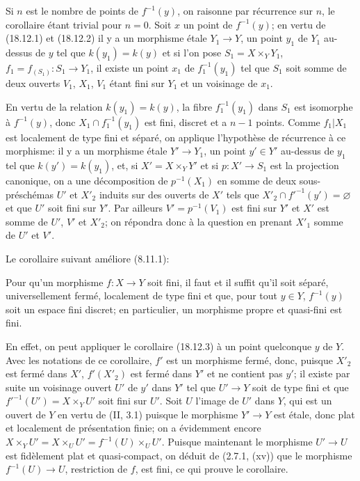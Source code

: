 Si $n$ est le nombre de points de $f^{-1}(y)$, on raisonne par récurrence sur $n$, le corollaire étant trivial pour $n=0$. Soit $x$ un point de $f^{-1}(y)$; en vertu de (18.12.1) et (18.12.2) il y a un morphisme étale $Y_1\to Y$, un point $y_1$ de $Y_1$ au-dessus de $y$ tel que $k(y_1)=k(y)$ et si l'on pose $S_1=X\times_Y Y_1$, $f_1=f_{(S_1)}:S_1\to Y_1$, il existe un point $x_1$ de $f_1^{-1}(y_1)$ tel que $S_1$ soit somme de deux ouverts $V_1$, $X_1$, $V_1$ étant fini sur $Y_1$ et un voisinage de $x_1$.


En vertu de la relation $k(y_1)=k(y)$, la fibre $f_1^{-1}(y_1)$ dans $S_1$ est isomorphe à $f^{-1}(y)$, donc $X_1\cap f_1^{-1}(y_1)$ est fini, discret et a $n-1$ points. Comme $f_1|X_1$ est localement de type fini et séparé, on applique l'hypothèse de récurrence à ce morphisme: il y a un morphisme étale $Y'\to Y_1$, un point $y'\in Y'$ au-dessus de $y_1$ tel que $k(y')=k(y_1)$, et, si $X'=X\times_Y Y'$ et si $p:X'\to S_1$ est la projection canonique, on a une décomposition de $p^{-1}(X_1)$ en somme de deux sous-préschémas $U'$ et $X'_2$ induits sur des ouverts de $X'$ tels que $X'_2\cap f'^{-1}(y')=\varnothing$ et que $U'$ soit fini sur $Y'$. Par ailleurs $V'=p^{-1}(V_1)$ est fini sur $Y'$ et $X'$ est somme de $U'$, $V'$ et $X'_2$; on répondra donc à la question en prenant $X'_1$ somme de $U'$ et $V'$.

Le corollaire suivant améliore (8.11.1):

\begin{corollary}[18.12.4]
\label{IV.18.12.4}
Pour qu'un morphisme $f:X\to Y$ soit fini, il faut et il suffit qu'il soit séparé, universellement fermé, localement de type fini et que, pour tout $y\in Y$, $f^{-1}(y)$ soit un espace fini discret; en particulier, un morphisme propre et quasi-fini est fini.
\end{corollary}

En effet, on peut appliquer le corollaire (18.12.3) à un point quelconque $y$ de $Y$. Avec les notations de ce corollaire, $f'$ est un morphisme fermé, donc, puisque $X'_2$ est fermé dans $X'$, $f'(X'_2)$ est fermé dans $Y'$ et ne contient pas $y'$; il existe par suite un voisinage ouvert $U'$ de $y'$ dans $Y'$ tel que $U'\to Y$ soit de type fini et que $f'^{-1}(U')=X\times_Y U'$ soit fini sur $U'$. Soit $U$ l'image de $U'$ dans $Y$, qui est un ouvert de $Y$ en vertu de (II, 3.1) puisque le morphisme $Y'\to Y$ est étale, donc plat et localement de présentation finie; on a évidemment encore $X\times_Y U'=X\times_U U'=f^{-1}(U)\times_U U'$. Puisque maintenant le morphisme $U'\to U$ est fidèlement plat et quasi-compact, on déduit de (2.7.1, (xv)) que le morphisme $f^{-1}(U)\to U$, restriction de $f$, est fini, ce qui prouve le corollaire.

